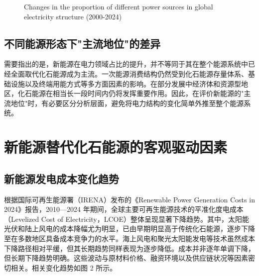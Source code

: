 \documentclass[twocolumn, a4paper, 10pt, UTF8]{ctexart}
\begin{document}
\begin{figure}[htbp]
    {Changes in the proportion of different power sources in global electricity structure (2000-2024)}
    \label{fig:power-structure}
\end{figure}

\subsection{不同能源形态下"主流地位"的差异}
需要指出的是，新能源在电力领域占比的提升，并不等同于其在整个能源系统中已经全面取代化石能源成为主流。一次能源消费结构仍然受到化石能源存量体系、基础设施以及终端用能方式等多方面因素的影响。在部分发展中经济体和资源型地区，化石能源在相当长一段时间内仍将发挥重要作用。因此，在评价新能源的"主流地位"时，有必要区分分析层面，避免将电力结构的变化简单外推至整个能源系统。

\section{新能源替代化石能源的客观驱动因素}
\subsection{新能源发电成本变化趋势}
根据国际可再生能源署（IRENA）发布的《Renewable Power Generation Costs in 2024》报告，2010—2024 年期间，全球主要可再生能源技术的平准化度电成本（Levelized Cost of Electricity，LCOE）整体呈现显著下降趋势。其中，太阳能光伏和陆上风电的成本降幅尤为明显，已由早期明显高于传统化石能源，逐步下降至在多数地区具备成本竞争力的水平。海上风电和聚光太阳能发电等技术虽然成本下降路径相对平缓，但其长期趋势同样表现为逐步降低。成本并非逐年单调下降，但长期下降趋势明确。这些波动与原材料价格、融资环境以及供应链状况等因素密切相关。相关变化趋势如图 2 所示。
\end{document}
